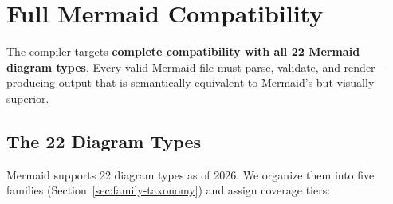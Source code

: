 \section{Full Mermaid Compatibility}
\label{sec:mermaid-compat}

The compiler targets \textbf{complete compatibility with all 22 Mermaid diagram types}.
Every valid Mermaid file must parse, validate, and render---producing output that is
semantically equivalent to Mermaid's but visually superior.

\subsection{The 22 Diagram Types}

Mermaid supports 22 diagram types as of 2026. We organize them into five families
(Section~\ref{sec:family-taxonomy}) and assign coverage tiers:

